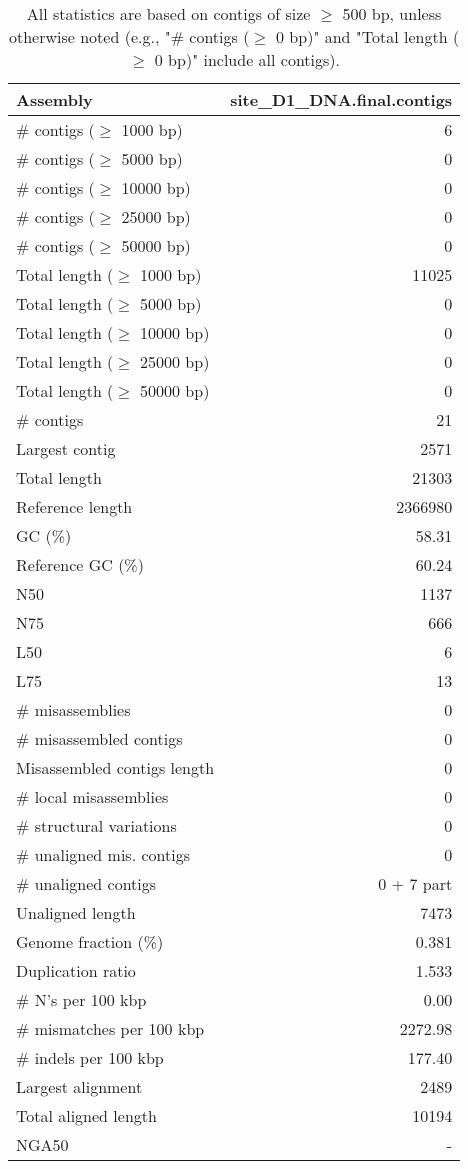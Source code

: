 \documentclass[12pt,a4paper]{article}
\begin{document}
\begin{table}[ht]
\begin{center}
\caption{All statistics are based on contigs of size $\geq$ 500 bp, unless otherwise noted (e.g., "\# contigs ($\geq$ 0 bp)" and "Total length ($\geq$ 0 bp)" include all contigs).}
\begin{tabular}{|l*{1}{|r}|}
\hline
Assembly & site\_D1\_DNA.final.contigs \\ \hline
\# contigs ($\geq$ 1000 bp) & 6 \\ \hline
\# contigs ($\geq$ 5000 bp) & 0 \\ \hline
\# contigs ($\geq$ 10000 bp) & 0 \\ \hline
\# contigs ($\geq$ 25000 bp) & 0 \\ \hline
\# contigs ($\geq$ 50000 bp) & 0 \\ \hline
Total length ($\geq$ 1000 bp) & 11025 \\ \hline
Total length ($\geq$ 5000 bp) & 0 \\ \hline
Total length ($\geq$ 10000 bp) & 0 \\ \hline
Total length ($\geq$ 25000 bp) & 0 \\ \hline
Total length ($\geq$ 50000 bp) & 0 \\ \hline
\# contigs & 21 \\ \hline
Largest contig & 2571 \\ \hline
Total length & 21303 \\ \hline
Reference length & 2366980 \\ \hline
GC (\%) & 58.31 \\ \hline
Reference GC (\%) & 60.24 \\ \hline
N50 & 1137 \\ \hline
N75 & 666 \\ \hline
L50 & 6 \\ \hline
L75 & 13 \\ \hline
\# misassemblies & 0 \\ \hline
\# misassembled contigs & 0 \\ \hline
Misassembled contigs length & 0 \\ \hline
\# local misassemblies & 0 \\ \hline
\# structural variations & 0 \\ \hline
\# unaligned mis. contigs & 0 \\ \hline
\# unaligned contigs & 0 + 7 part \\ \hline
Unaligned length & 7473 \\ \hline
Genome fraction (\%) & 0.381 \\ \hline
Duplication ratio & 1.533 \\ \hline
\# N's per 100 kbp & 0.00 \\ \hline
\# mismatches per 100 kbp & 2272.98 \\ \hline
\# indels per 100 kbp & 177.40 \\ \hline
Largest alignment & 2489 \\ \hline
Total aligned length & 10194 \\ \hline
NGA50 & - \\ \hline
\end{tabular}
\end{center}
\end{table}
\end{document}
